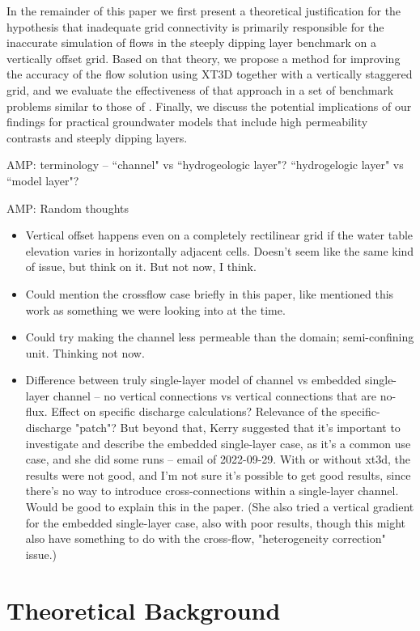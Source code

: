 \documentclass{article}
\begin{document}
In the remainder of this paper we first present a theoretical justification for the hypothesis that inadequate grid connectivity is primarily responsible for the inaccurate simulation of flows in the steeply dipping layer benchmark on a vertically offset grid. Based on that theory, we propose a method for improving the accuracy of the flow solution using XT3D together with a vertically staggered grid, and we evaluate the effectiveness of that approach in a set of benchmark problems similar to those of \cite{bardot2022}. Finally, we discuss the potential implications of our findings for practical groundwater models that include high permeability contrasts and steeply dipping layers.

{\color{red} AMP: terminology -- ``channel" vs ``hydrogeologic layer"? ``hydrogelogic layer" vs ``model layer"?}

{\color{red} AMP: Random thoughts
\begin{itemize}
	\item Vertical offset happens even on a completely rectilinear grid if the water table elevation varies in horizontally adjacent cells. Doesn't seem like the same kind of issue, but think on it. But not now, I think.
	\item Could mention the crossflow case briefly in this paper, like \cite{bardot2022} mentioned this work as something we were looking into at the time.
	\item Could try making the channel less permeable than the domain; semi-confining unit. Thinking not now.
	\item Difference between truly single-layer model of channel vs embedded single-layer channel -- no vertical connections vs vertical connections that are no-flux. Effect on specific discharge calculations? Relevance of the specific-discharge "patch"? But beyond that, Kerry suggested that it's important to investigate and describe the embedded single-layer case, as it's a common use case, and she did some runs -- email of 2022-09-29.  With or without xt3d, the results were not good, and I'm not sure it's possible to get good results, since there's no way to introduce cross-connections within a single-layer channel.  Would be good to explain this in the paper.  (She also tried a vertical gradient for the embedded single-layer case, also with poor results, though this might also have something to do with the cross-flow, "heterogeneity correction" issue.)
\end{itemize}
}

\section{Theoretical Background}
\end{document}
